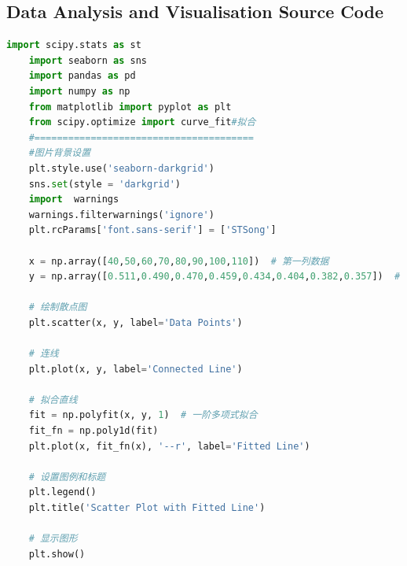 \documentclass[UTF8]{article}
\begin{document}
	
	\begin{appendix}
		\section{Data Analysis and Visualisation Source Code}
		\begin{lstlisting}[language=python]
	import scipy.stats as st
	import seaborn as sns
	import pandas as pd
	import numpy as np
	from matplotlib import pyplot as plt
	from scipy.optimize import curve_fit#拟合
	#=======================================
	#图片背景设置
	plt.style.use('seaborn-darkgrid')
	sns.set(style = 'darkgrid')
	import  warnings
	warnings.filterwarnings('ignore')
	plt.rcParams['font.sans-serif'] = ['STSong']
	
	x = np.array([40,50,60,70,80,90,100,110])  # 第一列数据
	y = np.array([0.511,0.490,0.470,0.459,0.434,0.404,0.382,0.357])  # 第二列数据
	
	# 绘制散点图
	plt.scatter(x, y, label='Data Points')
	
	# 连线
	plt.plot(x, y, label='Connected Line')
	
	# 拟合直线
	fit = np.polyfit(x, y, 1)  # 一阶多项式拟合
	fit_fn = np.poly1d(fit)
	plt.plot(x, fit_fn(x), '--r', label='Fitted Line')
	
	# 设置图例和标题
	plt.legend()
	plt.title('Scatter Plot with Fitted Line')
	
	# 显示图形
	plt.show()
		\end{lstlisting}

\end{appendix}
\end{document}

